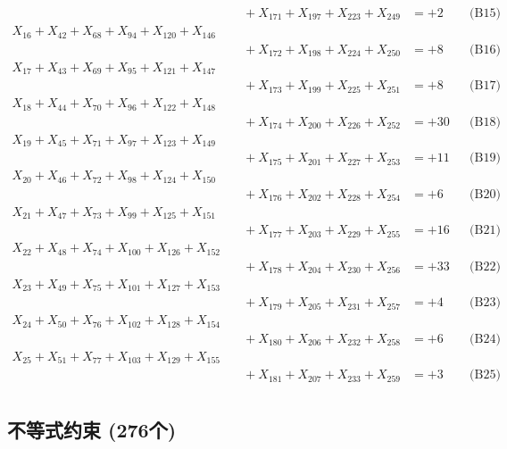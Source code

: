 \documentclass[a4paper,10pt]{article}
\begin{document}
{\begin{align}
&\quad  + X_{171} + X_{197} + X_{223} + X_{249} &= +2 && \text{(B15)} \\
X_{16} + X_{42} + X_{68} + X_{94} + X_{120} + X_{146} \\[0.1ex]
&\quad  + X_{172} + X_{198} + X_{224} + X_{250} &= +8 && \text{(B16)} \\
X_{17} + X_{43} + X_{69} + X_{95} + X_{121} + X_{147} \\[0.1ex]
&\quad  + X_{173} + X_{199} + X_{225} + X_{251} &= +8 && \text{(B17)} \\
X_{18} + X_{44} + X_{70} + X_{96} + X_{122} + X_{148} \\[0.1ex]
&\quad  + X_{174} + X_{200} + X_{226} + X_{252} &= +30 && \text{(B18)} \\
X_{19} + X_{45} + X_{71} + X_{97} + X_{123} + X_{149} \\[0.1ex]
&\quad  + X_{175} + X_{201} + X_{227} + X_{253} &= +11 && \text{(B19)} \\
\allowbreak
X_{20} + X_{46} + X_{72} + X_{98} + X_{124} + X_{150} \\[0.1ex]
&\quad  + X_{176} + X_{202} + X_{228} + X_{254} &= +6 && \text{(B20)} \\
X_{21} + X_{47} + X_{73} + X_{99} + X_{125} + X_{151} \\[0.1ex]
&\quad  + X_{177} + X_{203} + X_{229} + X_{255} &= +16 && \text{(B21)} \\
X_{22} + X_{48} + X_{74} + X_{100} + X_{126} + X_{152} \\[0.1ex]
&\quad  + X_{178} + X_{204} + X_{230} + X_{256} &= +33 && \text{(B22)} \\
X_{23} + X_{49} + X_{75} + X_{101} + X_{127} + X_{153} \\[0.1ex]
&\quad  + X_{179} + X_{205} + X_{231} + X_{257} &= +4 && \text{(B23)} \\
X_{24} + X_{50} + X_{76} + X_{102} + X_{128} + X_{154} \\[0.1ex]
&\quad  + X_{180} + X_{206} + X_{232} + X_{258} &= +6 && \text{(B24)} \\
\allowbreak
X_{25} + X_{51} + X_{77} + X_{103} + X_{129} + X_{155} \\[0.1ex]
&\quad  + X_{181} + X_{207} + X_{233} + X_{259} &= +3 && \text{(B25)} \\
\end{align}
}

\subsection{不等式约束 (276个)}
\end{document}
